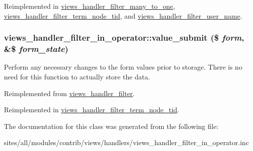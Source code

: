 Reimplemented in \hyperlink{classviews__handler__filter__many__to__one_6c5e3bbabc2ed73418f835195c10f451}{views\_\-handler\_\-filter\_\-many\_\-to\_\-one}, \hyperlink{classviews__handler__filter__term__node__tid_3259d8a91cb0c13c51c02942b267b131}{views\_\-handler\_\-filter\_\-term\_\-node\_\-tid}, and \hyperlink{classviews__handler__filter__user__name_08bc953c1682728eb0d38e5592a3286e}{views\_\-handler\_\-filter\_\-user\_\-name}.\hypertarget{classviews__handler__filter__in__operator_f7b01b1f4e53aec7f4b1065606819624}{
\subsubsection[{value\_\-submit}]{\setlength{\rightskip}{0pt plus 5cm}views\_\-handler\_\-filter\_\-in\_\-operator::value\_\-submit (\$ {\em form}, \/  \&\$ {\em form\_\-state})}}
\label{classviews__handler__filter__in__operator_f7b01b1f4e53aec7f4b1065606819624}


Perform any necessary changes to the form values prior to storage. There is no need for this function to actually store the data. 

Reimplemented from \hyperlink{classviews__handler__filter_e71b3b09b75932ec6a8db33d56d41035}{views\_\-handler\_\-filter}.

Reimplemented in \hyperlink{classviews__handler__filter__term__node__tid_48244c2456ac78e1855d9a48632ce045}{views\_\-handler\_\-filter\_\-term\_\-node\_\-tid}.

The documentation for this class was generated from the following file:\begin{CompactItemize}
\item 
sites/all/modules/contrib/views/handlers/views\_\-handler\_\-filter\_\-in\_\-operator.inc\end{CompactItemize}
